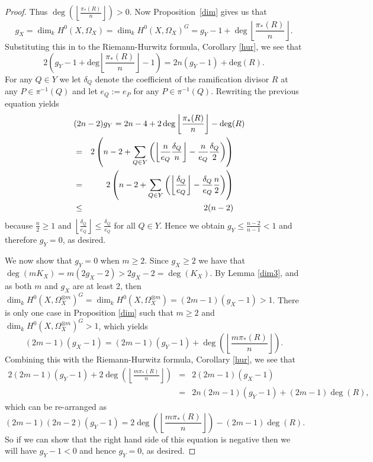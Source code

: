 \begin{proof}
    Thus $\deg\left( \left\lfloor \frac{\pi_*(R)}{n} \right\rfloor \right) >0$. 
    Now Proposition~\ref{dim} gives us that
      \begin{equation*}
	g_X=\dim_k H^0(X,\Omega_X)=\dim_k H^0(X,\Omega_X)^G= g_Y-1+\deg\left\lfloor \frac{\pi_*(R)}{n} \right\rfloor.
      \end{equation*}
    Substituting this in to the Riemann-Hurwitz formula, Corollary \ref{hur}, we see that
      \begin{equation*}
	2\left(g_Y - 1 + \textrm{deg}\left \lfloor \frac{\pi_*(R)}{n} \right \rfloor -1 \right) = 2n (g_Y -1) + \textrm{deg}(R).
      \end{equation*}
    For any $Q \in Y$ we let $\delta_Q$ denote the coefficient of the ramification divisor $R$ at any $P \in \pi^{-1}(Q)$ and let $e_Q := e_P$ for any $P \in \pi^{-1}(Q)$. 
    Rewriting the previous equation yields
      \begin{eqnarray*}
	\lefteqn{(2n-2)g_Y = 2n-4 + 2 \,\textrm{deg}\left \lfloor \frac{\pi_*(R)}{n}\right \rfloor - \textrm{deg}(R)}\\
	&=& 2 \left(n-2 + \sum_{Q \in Y} \left(\left\lfloor \frac{n}{e_Q} \frac{\delta_Q}{n} \right\rfloor - \frac{n}{e_Q} \frac{\delta_Q}{2}\right) \right)\\
	&=& 2 \left(n-2 + \sum_{Q \in Y} \left( \left\lfloor \frac{\delta_Q}{e_Q} \right\rfloor - \frac{\delta_Q}{e_Q} \frac{n}{2} \right)\right)\\
	& \le & 2(n-2)
      \end{eqnarray*}
    because $\frac{n}{2} \ge 1$ and $\left\lfloor \frac{\delta_Q}{e_Q}\right\rfloor \le \frac{\delta_Q}{e_Q}$ for all $Q \in Y$. 
    Hence we obtain $g_Y \le \frac{n-2}{n-1} < 1$ and therefore $g_Y =0$, as desired.

    We now show that $g_Y=0$ when $m\geq 2$. 
    Since $g_X\geq 2$ we have that $\deg(mK_X)=m(2g_X-2)>2g_X-2=\deg(K_X)$.
    By Lemma \ref{dim3}, and as both $m$ and $g_X$ are at least 2, then $\dim_kH^0(X,\Omega_X^{\otimes m})^G=\dim_kH^0(X,\Omega_X^{\otimes m})=(2m-1)(g_X-1)>1$.
    There is only one case in Proposition \ref{dim} such that $m\geq 2$ and $\dim_k H^0(X,\Omega_X^{\otimes m})^G>1$, which yields 
      \begin{equation*}
	(2m-1)(g_X-1)=(2m-1)(g_Y-1)+\deg\left(\left\lfloor \frac{m\pi_*(R)}{n} \right\rfloor \right).
      \end{equation*}
    Combining this with the Riemann-Hurwitz formula, Corollary \ref{hur}, we see that
      \begin{eqnarray*}
	2(2m-1)(g_Y-1)+2\deg\left(\left\lfloor\frac{m\pi_*(R)}{n}\right\rfloor\right) & = & 2(2m-1)(g_X-1)\\
	& = & 2n(2m-1)(g_Y-1)+(2m-1)\deg(R),
      \end{eqnarray*}
    which can be re-arranged as
      \begin{equation*}
	(2m-1)(2n-2)(g_Y-1)=2\deg\left(\left\lfloor\frac{m\pi_*(R)}{n}\right\rfloor\right)-(2m-1)\deg(R).
      \end{equation*}
    So if we can show that the right hand side of this equation is negative then we will have $g_Y-1<0$ and hence $g_Y=0$, as desired.


\end{proof}
